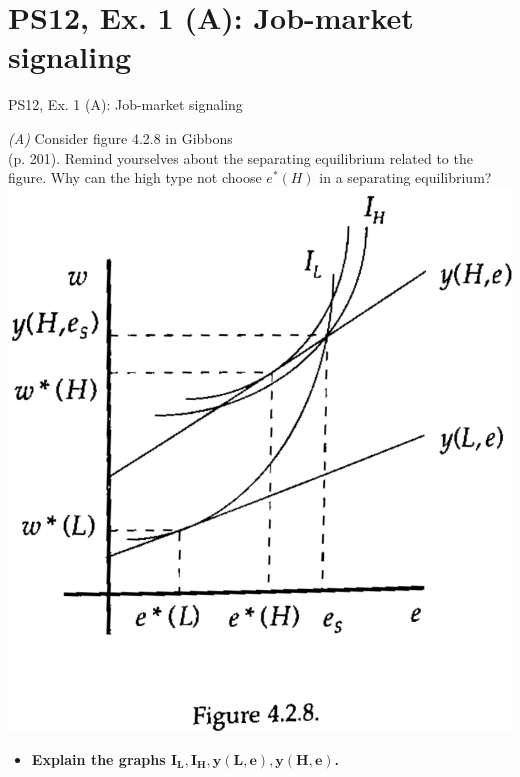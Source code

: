\section{PS12, Ex. 1 (A): Job-market signaling}

\begin{frame}{PS12, Ex. 1 (A): Job-market signaling}
    \begin{multicols}{2}
      \textit{(A)} Consider figure 4.2.8 in Gibbons\\
      (p. 201). Remind yourselves about the separating equilibrium related to the figure. Why can the high type not choose $e^*(H)$ in a separating equilibrium?\vspace{8pt}
      \includegraphics[width=\columnwidth]{figures/Gibbons428}
      \vfill\null\columnbreak
      \begin{itemize}
        \item[Step 1:] \textbf{Explain the graphs $\bm{I_L,I_H,y(L,e),y(H,e)}$.}
      \end{itemize}
      \vfill\null
    \end{multicols}
\end{frame}
